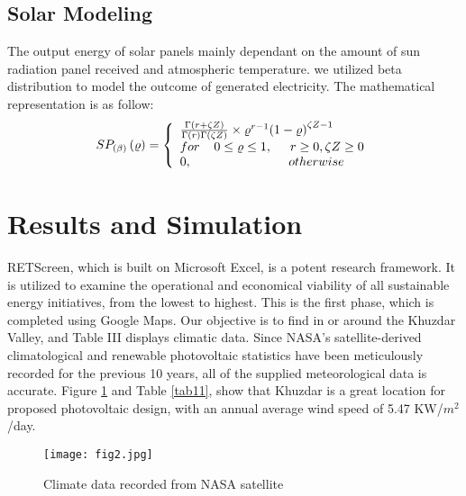 \documentclass[conference]{IEEEtran}
\begin{document}
\subsection{Solar Modeling}
The output energy of solar panels mainly dependant on the amount of sun radiation panel received and atmospheric temperature. we utilized beta distribution to model the outcome of generated electricity. The mathematical representation is as follow:
\begin{equation*}\label{h}
{SP_{\left( {\beta} \right)}}\left( \varrho  \right) = \left\{ \begin{array}{l}
\frac{{\Gamma \left( {r + \zeta Z} \right)}}{{\Gamma \left( r \right)\Gamma \left( {\zeta Z} \right)}} \times {\varrho ^{r - 1}}{\left( {1 - \varrho } \right)^{\zeta Z - 1}}\\
for\hspace{4mm}0 \le \varrho  \le 1,\hspace{5mm}r \ge 0,\zeta Z \ge 0\\
0,\hspace{27mm}otherwise
\end{array} \right.
\end{equation*}
\section{Results and Simulation}
RETScreen, which is built on Microsoft Excel, is a potent research framework. It is utilized to examine the operational and economical viability of all sustainable energy initiatives, from the lowest to highest. This is the first phase, which is completed using Google Maps. Our objective is to find in or around the Khuzdar Valley, and Table III displays climatic data. Since NASA's satellite-derived climatological and renewable photovoltaic statistics have been meticulously recorded for the previous 10 years, all of the supplied meteorological data is accurate. Figure \ref{fig3} and Table \ref{tab11}, show that Khuzdar is a great location for proposed photovoltaic design, with an annual average wind speed of 5.47 KW/$m^2$/day.
\begin{figure}[!]
\centerline{\texttt{[image: fig2.jpg]}}
\caption{Climate data recorded from NASA satellite}
\label{fig3}
\end{figure}
\end{document}
